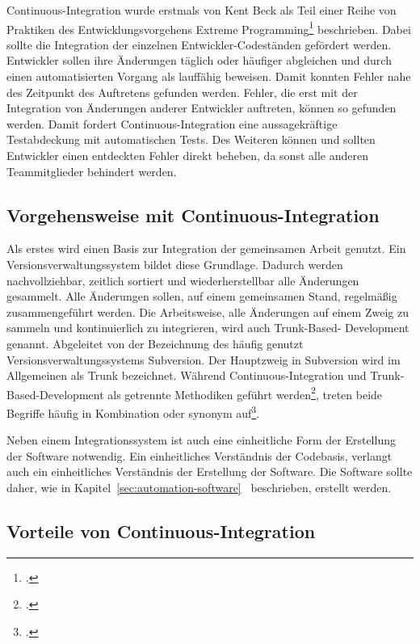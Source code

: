Continuous-Integration wurde erstmals von Kent Beck als Teil einer Reihe von Praktiken des Entwicklungsvorgehens \glqq Extreme Programming\grqq{}\footcite[vgl.][]{kent1999} beschrieben. Dabei sollte die Integration der einzelnen Entwickler-Codeständen gefördert werden. Entwickler sollen ihre Änderungen täglich oder häufiger abgleichen und durch einen automatisierten Vorgang als lauffähig beweisen. Damit konnten Fehler nahe des Zeitpunkt des Auftretens gefunden werden. Fehler, die erst mit der Integration von Änderungen anderer Entwickler auftreten, können so gefunden werden. Damit fordert Continuous-Integration eine aussagekräftige Testabdeckung mit automatischen Tests. Des Weiteren können und sollten Entwickler einen entdeckten Fehler direkt beheben, da sonst alle anderen Teammitglieder behindert werden.

\subsection{Vorgehensweise mit Continuous-Integration}

Als erstes wird einen Basis zur Integration der gemeinsamen Arbeit genutzt. Ein Versionsverwaltungssystem bildet diese Grundlage. Dadurch werden nachvollziehbar, zeitlich sortiert und wiederherstellbar alle Änderungen gesammelt. Alle Änderungen sollen, auf einem gemeinsamen Stand, regelmäßig zusammengeführt werden. Die Arbeitsweise, alle Änderungen auf einem Zweig zu sammeln und kontinuierlich zu integrieren, wird auch Trunk-Based-
Development genannt. Abgeleitet von der Bezeichnung des häufig genutzt Versionsverwaltungssystems Subversion. Der Hauptzweig in Subversion wird im Allgemeinen als \glqq Trunk\grqq{} bezeichnet. Während Continuous-Integration und Trunk-Based-Development als getrennte Methodiken geführt werden\footcite[vgl.][]{trunkbaseddevelopment}, treten beide Begriffe häufig in Kombination oder synonym auf\footcite[vgl.][]{fowler-feature-branch}.

Neben einem Integrationssystem ist auch eine einheitliche Form der Erstellung der Software notwendig. Ein einheitliches Verständnis der Codebasis, verlangt auch ein einheitliches Verständnis der Erstellung der Software. Die Software sollte daher, wie in Kapitel~\ref{sec:automation-software}~ beschrieben, erstellt werden.


\subsection{Vorteile von Continuous-Integration}

